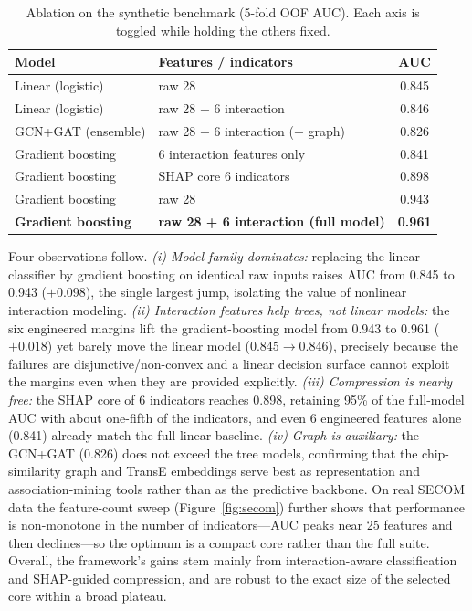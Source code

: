 \documentclass[electronics,article,submit,pdftex,moreauthors]{Definitions/mdpi}
\begin{document}
\begin{table}[H]
\caption{Ablation on the synthetic benchmark (5-fold OOF AUC). Each axis is toggled while holding the others fixed.}
\label{tab:ablation}
\begin{tabularx}{\textwidth}{Xlc}
\toprule
\textbf{Model} & \textbf{Features / indicators} & \textbf{AUC}\\
\midrule
Linear (logistic) & raw 28 & 0.845\\
Linear (logistic) & raw 28 + 6 interaction & 0.846\\
GCN+GAT (ensemble) & raw 28 + 6 interaction (+ graph) & 0.826\\
Gradient boosting & 6 interaction features only & 0.841\\
Gradient boosting & SHAP core 6 indicators & 0.898\\
Gradient boosting & raw 28 & 0.943\\
\textbf{Gradient boosting} & \textbf{raw 28 + 6 interaction (full model)} & \textbf{0.961}\\
\bottomrule
\end{tabularx}
\end{table}

Four observations follow. \emph{(i) Model family dominates:} replacing the linear classifier by gradient boosting on identical raw inputs raises AUC from 0.845 to 0.943 ($+0.098$), the single largest jump, isolating the value of nonlinear interaction modeling. \emph{(ii) Interaction features help trees, not linear models:} the six engineered margins lift the gradient-boosting model from 0.943 to 0.961 ($+0.018$) yet barely move the linear model (0.845$\rightarrow$0.846), precisely because the failures are disjunctive/non-convex and a linear decision surface cannot exploit the margins even when they are provided explicitly. \emph{(iii) Compression is nearly free:} the SHAP core of 6 indicators reaches 0.898, retaining 95\% of the full-model AUC with about one-fifth of the indicators, and even 6 engineered features alone (0.841) already match the full linear baseline. \emph{(iv) Graph is auxiliary:} the GCN+GAT (0.826) does not exceed the tree models, confirming that the chip-similarity graph and TransE embeddings serve best as representation and association-mining tools rather than as the predictive backbone. On real SECOM data the feature-count sweep (Figure~\ref{fig:secom}) further shows that performance is non-monotone in the number of indicators---AUC peaks near 25 features and then declines---so the optimum is a compact core rather than the full suite. Overall, the framework's gains stem mainly from interaction-aware classification and SHAP-guided compression, and are robust to the exact size of the selected core within a broad plateau.
\end{document}
